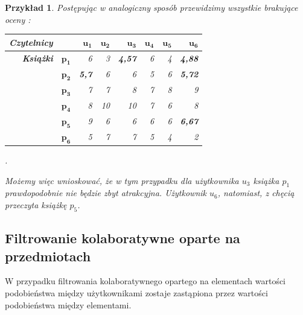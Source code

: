 \documentclass[12pt,a4paper]{report}
\newtheorem{przyklad}{Przykład}[chapter]{\normalfont}
\begin{document}
\begin{przyklad}
Postępując w analogiczny sposób przewidzimy wszystkie brakujące oceny :
\begin{center}
\begin{tabular}{|r|r|r|r|r|r|r|r|} \hline
\textbf{Czytelnicy} & & $\mathbf{u_1}$ & $\mathbf{u_2}$ & $\mathbf{u_3}$ & $\mathbf{u_4}$ & $\mathbf{u_5}$ & $\mathbf{u_6}$ \\
\hline
\hline
\textbf{Książki} &$\mathbf{p_1}$ & 6 & 3 & \textbf{4,57} & 6 & 4 & \textbf{4,88} \\
\hline
&$\mathbf{p_2}$ & \textbf{5,7} & 6 & 6 & 5 & 6 & \textbf{5,72} \\
\hline
&$\mathbf{p_3}$ & 7 & 7 & 8 & 7 & 8 & 9 \\
\hline
&$\mathbf{p_4}$ & 8 & 10 & 10 & 7 & 6 & 8 \\
\hline
&$\mathbf{p_5}$ & 9 & 6 & 6 & 6 & 6 & \textbf{6,67}  \\
\hline
&$\mathbf{p_6}$ & 5 & 7 & 7 & 5 & 4 & 2 \\
\hline
\end{tabular}.
\end{center}
Możemy więc wnioskować, że w tym przypadku dla użytkownika $u_3$ książka $p_1$ prawdopodobnie nie będzie zbyt atrakcyjna. Użytkownik $u_6$, natomiast, z chęcią przeczyta książkę $p_5$. 
\end{przyklad}

\subsection{Filtrowanie kolaboratywne oparte na  przedmiotach}
W przypadku filtrowania kolaboratywnego opartego na elementach wartości podobieństwa między użytkownikami zostaje zastąpiona przez wartości podobieństwa między elementami.
\end{document}
